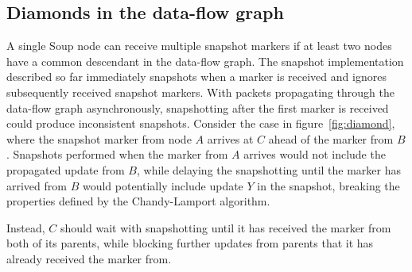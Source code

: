 \subsection{Diamonds in the data-flow graph}

A single Soup node can receive multiple snapshot markers if at least two nodes
have a common descendant in the data-flow graph. The snapshot implementation
described so far immediately snapshots when a marker is received and ignores
subsequently received snapshot markers. With packets propagating through the
data-flow graph asynchronously, snapshotting after the first marker is received
could produce inconsistent snapshots. Consider the case in
figure~\ref{fig:diamond}, where the snapshot marker from node $ A $ arrives at $
C $ ahead of the marker from $ B $. Snapshots performed when the marker from $ A
$ arrives would not include the propagated update from $ B $, while delaying the
snapshotting until the marker has arrived from $ B $ would potentially include
update $ Y $ in the snapshot, breaking the properties defined by the
Chandy-Lamport algorithm.


Instead, $ C $ should wait with snapshotting until it has received the marker
from both of its parents, while blocking further updates from parents that it
has already received the marker from.
